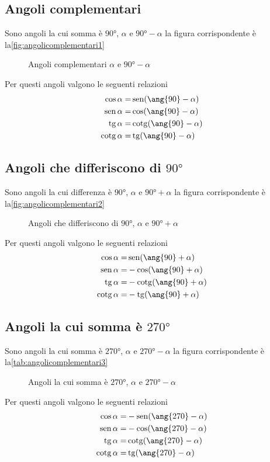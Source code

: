 \subsection{Angoli complementari}
Sono angoli la cui somma è $\ang{90}$, $\alpha$ e $\ang{90}-\alpha$ la figura corrispondente è la\nobs\vref{fig:angolicomplementari1}
\begin{figure}[H]
	\centering
	
		\caption{Angoli complementari $\alpha$ e  $\ang{90}-\alpha$}
		\label{fig:angolicomplementari1}
\end{figure}
Per questi angoli valgono le seguenti relazioni
\begin{align}
\cos\alpha=&{}\sen(\ang{90}-\alpha)\\
\sen\alpha=&{}\cos(\ang{90}-\alpha)\\
\tg\alpha=&{}\cotg(\ang{90}-\alpha)\\
\cotg\alpha=&{}\tg(\ang{90}-\alpha)
\end{align}
\subsection{Angoli che differiscono di $\ang{90}$}
Sono angoli la cui differenza è $\ang{90}$, $\alpha$ e $\ang{90}+\alpha$ la figura corrispondente è la\nobs\vref{fig:angolicomplementari2}
\begin{figure}[H]
	\centering
	
\caption{Angoli che differiscono di $\ang{90}$, $\alpha$ e $\ang{90}+\alpha$}
\label{fig:angolicomplementari2}
\end{figure}
Per questi angoli valgono le seguenti relazioni
\begin{align}
\cos\alpha=&{}\sen(\ang{90}+\alpha)\\
\sen\alpha=&{}-\cos(\ang{90}+\alpha)\\
\tg\alpha=&{}-\cotg(\ang{90}+\alpha)\\
\cotg\alpha=&{}-\tg(\ang{90}+\alpha)
\end{align}
\subsection{Angoli la cui somma è $\ang{270}$}
Sono angoli la cui somma è $\ang{270}$, $\alpha$ e $\ang{270}-\alpha$ la figura corrispondente è la\nobs\vref{tab:angolicomplementari3}
\begin{figure}[H]
	\centering
		
		\caption{Angoli la cui somma è $\ang{270}$,  $\alpha$ e $\ang{270}-\alpha$}
		\label{tab:angolicomplementari3}
\end{figure}
Per questi angoli valgono le seguenti relazioni
\begin{align}
\cos\alpha=&{}-\sen(\ang{270}-\alpha)\\
\sen\alpha=&{}-\cos(\ang{270}-\alpha)\\
\tg\alpha=&{}\cotg(\ang{270}-\alpha)\\
\cotg\alpha=&{}\tg(\ang{270}-\alpha)
\end{align}
